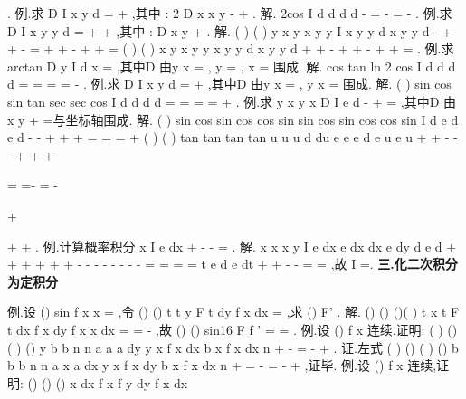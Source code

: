 \int 
\int 
\int 
\int 
. 
\textcolor{lyred}{例}.求
D
I
x
y d\sigma 
=
+
\int \int 
,其中
: 2
D
x
x
y
-
\le 
+
\le 
. 
解.
2cos
I
d
d
d
d
\pi 
\pi 
\theta 
\pi 
\theta \rho \rho \rho 
\theta 
\rho \rho \rho 
\pi 
-
=
\cdots 
-
\cdots 
=
-
\int 
\int 
\int 
\int 
. 
\textcolor{lyred}{例}.求
D
I
x
y
y d\sigma 
=
+
+
\int \int 
,其中
:
D x
y
+
\le 
. 
解.
(
)
(
)
y x
y
x
y
y
I
x
y
y d
x
y
y d
\sigma 
\sigma 
-
\le 
+
\le 
+
\le -
=
+
+
-
+
+
=
\int \int 
\int \int 
(
)
(
)
x
y
x
y
y
x
y
y d
x
y
y d
\sigma 
\sigma 
\pi 
+
\le 
+
\le -
+
+
-
+
+
=
\int \int 
\int \int 
. 
\textcolor{lyred}{例}.求
arctan
D
y
I
d
x \sigma 
=\int \int 
,其中D 由y
x
=
,
y =
,
x =
围成. 
解.
cos
tan
ln 2
cos
I
d
d
d
d
\pi 
\pi 
\pi 
\theta 
\pi 
\theta 
\theta \rho \rho 
\theta 
\theta 
\theta 
\theta 
\theta 
=
\cdots 
=
\cdots 
=
=
-
\int 
\int 
\int 
\int 
. 
\textcolor{lyred}{例}.求
D
I
x
y d\sigma 
=
+
\int \int 
,其中D 由y
x
=
,
y
x
=
围成. 
解.
(
)
sin
cos
sin
tan
sec
sec
cos
I
d
d
d
d
\theta 
\pi 
\pi 
\pi 
\theta 
\theta 
\theta 
\rho \rho \rho 
\theta 
\theta 
\theta 
\theta 
\theta 
=
\cdots 
=
=
=
+
\int 
\int 
\int 
\int 
. 
\textcolor{lyred}{例}.求
y x
y x
D
I
e
d\sigma 
-
+
=\int \int 
,其中D 由
x
y
+
=与坐标轴围成. 
解.
(
)
sin
cos
sin
cos
cos
sin
sin
cos
sin
cos
cos
sin
I
d
e
d
e
d
\pi 
\pi 
\theta 
\theta 
\theta 
\theta 
\theta 
\theta 
\theta 
\theta 
\theta 
\theta 
\theta 
\rho \rho 
\theta 
\theta 
\theta 
-
-
+
+
+
=
=
=
+
\int 
\int 
\int 
(
)
(
)
tan
tan
tan
tan
u
u
u
d
du
e
e
e
d
e
u
e
u
\pi 
\theta 
\theta 
\theta 
\theta 
+\infty 
+\infty 
-
-
-
+
+
+


=
=-
=
-


+


+
+
\int 
\int 
\int 
. 
\textcolor{lyred}{例}.计算概率积分
x
I
e
dx
\pi 
+\infty 
-
-\infty 
=
\int 
. 
解.
x
x
x
y
I
e
dx
e
dx
dx
e
dy
d
e
d
\pi 
\rho 
\theta 
\rho \rho 
\pi 
\pi 
\pi 
+\infty 
+\infty 
+\infty 
+\infty 
+\infty 
+
-
-
-
-
-\infty 
-\infty 
-\infty 
-\infty 
=
\cdots 
=
=
=
\int 
\int 
\int 
\int 
\int 
\int 
t
e
d
e dt
\rho 
\rho 
+\infty 
+\infty 
-
-
=
=
\int 
\int 
,故
I =. 
\vspace{4pt}
{\bfseries \textcolor{lyred}{三.化二次积分为定积分}}

\textcolor{lyred}{例}.设
()
sin
f x
x
=
,令
()
()
t
t
y
F t
dy
f x dx
=\int \int 
,求
()
F'
. 
解.
()
()
()(
)
t
x
t
F t
dx
f x dy
f x
x
dx
=
=
-
\int \int 
\int 
,故
()
()
sin16
F
f
'
=
=
. 
\textcolor{lyred}{例}.设
()
f x 连续,证明:
(
)
()
(
)
()
y
b
b
n
n
a
a
a
dy
y
x
f x dx
b
x
f x dx
n
+
-
=
-
+
\int \int 
\int 
. 
证.左式
(
)
()
(
)
()
b
b
b
n
n
a
x
a
dx
y
x
f x dy
b
x
f x dx
n
+
=
-
=
-
+
\int \int 
\int 
,证毕. 
\textcolor{lyred}{例}.设
()
f x 连续,证明:
()
()
()
x
dx
f x f
y dy
f x dx


